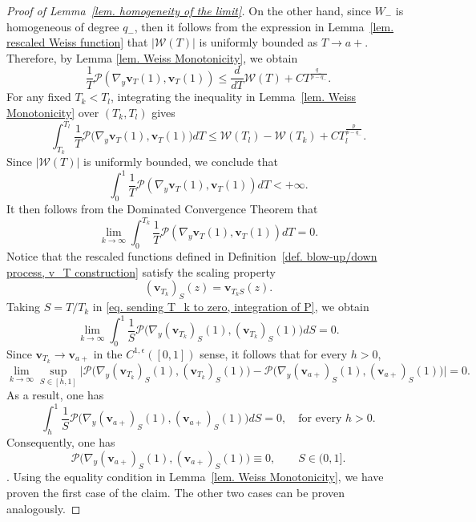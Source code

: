 \documentclass[11pt,twoside,reqno]{amsart}
\numberwithin{equation}{section}
\begin{document}
\begin{proof}[Proof of Lemma~\ref{lem. homogeneity of the limit}]
On the other hand, since $W_{-}$ is homogeneous of degree $q_{-}$, then it follows from the expression in Lemma~\ref{lem. rescaled Weiss function} that $|\mathcal{W}(T)|$ is uniformly bounded as $T\to a+$. 
Therefore,
by Lemma \ref{lem. Weiss Monotonicity}, we obtain
\begin{equation*}
    \frac{1}{T}\mathcal{P}\left(\nabla_{y}\mathbf{v}_{T}(1),\mathbf{v}_{T}(1)\right)\leq\frac{d}{dT}\mathcal{W}(T)+C T^{\frac{q_-}{p-q_-}} .
\end{equation*}
For any fixed $T_k<T_l$, integrating the inequality in Lemma~\ref{lem. Weiss Monotonicity} over $(T_k,T_l)$ gives
\begin{equation*}
\int_{T_k}^{T_l}\frac{1}{T}\mathcal{P}\big(\nabla_{y}\mathbf{v}_{T}(1),\mathbf{v}_{T}(1)\big)dT\leq\mathcal{W}(T_{l})-\mathcal{W}(T_{k})+CT_{l}^{\frac{p}{p-q_{-}}}.
\end{equation*}
Since $|\mathcal{W}(T)|$ is uniformly bounded, we conclude that
\begin{equation*}
    \int_{0}^{1}\frac{1}{T}\mathcal{P}\left(\nabla_{y}\mathbf{v}_{T}(1),\mathbf{v}_{T}(1)\right)dT<+\infty.
\end{equation*}
It then follows from the Dominated Convergence Theorem that
\begin{equation}\label{eq. sending T_k to zero, integration of P}
    \lim_{k\to\infty}\int_{0}^{T_{k}}\frac{1}{T}\mathcal{P}\left(\nabla_{y}\mathbf{v}_{T}(1),\mathbf{v}_{T}(1)\right)dT=0.
\end{equation}
Notice that the rescaled functions defined in
Definition~\ref{def. blow-up/down process, v_T construction} satisfy the scaling
property
\[
(\mathbf v_{T_k})_S(z)=\mathbf v_{T_kS}(z).
\]
Taking $S=T/T_k$ in \eqref{eq. sending T_k to zero, integration of P}, we obtain
\begin{equation*}
    \lim_{k\to\infty}\int_{0}^{1}\frac{1}{S}\mathcal{P}\Big(\nabla_{y}(\mathbf{v}_{T_{k}})_{S}(1),(\mathbf{v}_{T_{k}})_{S}(1)\Big)dS=0.
\end{equation*}
Since $\mathbf{v}_{T_{k}}\to\mathbf{v}_{a+}$ in the $C^{1,\epsilon}([0,1])$ sense, it follows that for every $h>0$,
\begin{equation*}
    \lim_{k\to\infty}\sup_{S\in[h,1]}\Big|\mathcal{P}\Big(\nabla_{y}(\mathbf{v}_{T_{k}})_{S}(1),(\mathbf{v}_{T_{k}})_{S}(1)\Big)-\mathcal{P}\Big(\nabla_{y}(\mathbf{v}_{a+})_{S}(1),(\mathbf{v}_{a+})_{S}(1)\Big)\Big|=0.
\end{equation*}
As a result, one has
\begin{equation*}
    \int_{h}^{1}\frac{1}{S}\mathcal{P}\Big(\nabla_{y}(\mathbf{v}_{a+})_{S}(1),(\mathbf{v}_{a+})_{S}(1)\Big)dS=0,\quad\mbox{for every }h>0.
\end{equation*}
Consequently, one has \[
\mathcal P
\Big(
\nabla_y(\mathbf v_{a+})_S(1),
(\mathbf v_{a+})_S(1)
\Big)
\equiv0,
\qquad S\in(0,1].
\]. Using the equality condition in Lemma~\ref{lem. Weiss Monotonicity}, we have proven the first case of the claim. The other two cases can be proven analogously.


\end{proof}
\end{document}
